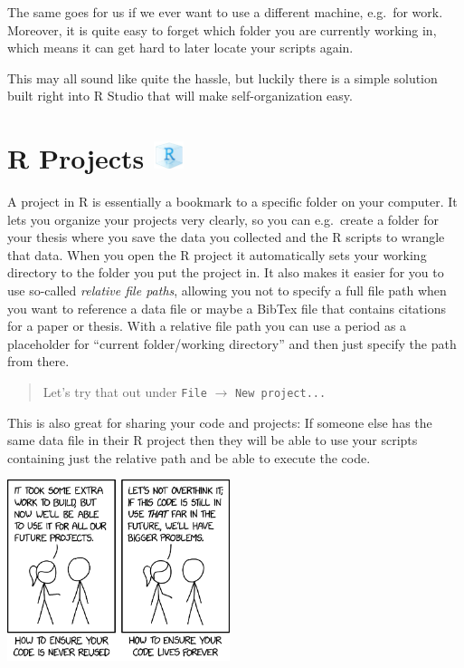 \documentclass[
]{book}
\begin{document}
The same goes for us if we ever want to use a different machine, e.g.~for work.
Moreover, it is quite easy to forget which folder you are currently working in, which means it can get hard to later locate your scripts again.

This may all sound like quite the hassle, but luckily there is a simple solution built right into R Studio that will make self-organization easy.

\section[R Projects ]{\texorpdfstring{R Projects \protect\includegraphics[width=\textwidth,height=0.3125in]{./img/rproj.png}}{R Projects R Project}}\label{r-projects-r-project}

A project in R is essentially a bookmark to a specific folder on your computer.
It lets you organize your projects very clearly, so you can e.g.~create a folder for your thesis where you save the data you collected and the R scripts to wrangle that data.
When you open the R project it automatically sets your working directory to the folder you put the project in.
It also makes it easier for you to use so-called \emph{relative file paths}, allowing you not to specify a full file path when you want to reference a data file or maybe a BibTex file that contains citations for a paper or thesis.
With a relative file path you can use a period as a placeholder for ``current folder/working directory'' and then just specify the path from there.

\begin{quote}
Let's try that out under \texttt{File} \(\rightarrow\) \texttt{New\ project...}
\end{quote}

This is also great for sharing your code and projects:
If someone else has the same data file in their R project then they will be able to use your scripts containing just the relative path and be able to execute the code.

\includegraphics[width=\textwidth,height=2.08333in]{./img/code_lifespan.png}
\end{document}
